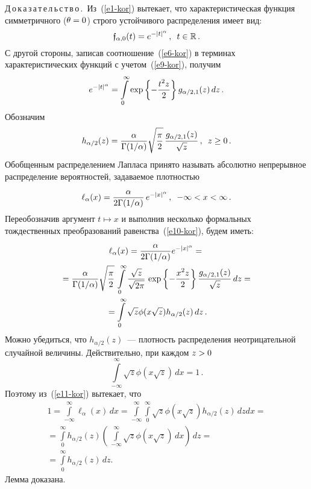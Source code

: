 \begin{multicols}{2}
\noindent
Д\,о\,к\,а\,з\,а\,т\,е\,л\,ь\,с\,т\,в\,о\,.\ Из~(\ref{e1-kor}) вытекает, что характеристическая
функция симметричного ($\theta\hm=0$) строго устойчивого распределения
имеет вид:
\begin{equation}
\mathfrak{f}_{\alpha,0}(t)=e^{-|t|^{\alpha}}\,,\enskip t\in\mathbb{R}\,. \label{e9-kor}
\end{equation}
С другой стороны, записав соотношение~(\ref{e6-kor}) в терминах
характеристических функций с учетом~(\ref{e9-kor}), получим
\begin{equation}
e^{-|t|^{\alpha}}=\int\limits_0^{\infty}\exp\left\{-\displaystyle\frac{\displaystyle t^2z\mathstrut}{\displaystyle 2\mathstrut}\right\}
g_{\alpha/2,1}(z)\,dz\,.\label{e10-kor}
\end{equation}
Обозначим
$$
h_{\alpha/2}(z)=\displaystyle\frac{\displaystyle \alpha\mathstrut}{\displaystyle \Gamma({1}/{\alpha})\mathstrut}\sqrt{\displaystyle\frac{\displaystyle \pi\mathstrut}{\displaystyle 2\mathstrut}}\,
\displaystyle\frac{\displaystyle g_{\alpha/2,1}(z)\mathstrut}{\displaystyle \sqrt{z}\mathstrut}\,,\enskip
z\ge0\,.
$$
Обобщенным распределением Лапласа принято называть абсолютно
непрерывное распределение вероятностей, задаваемое плотностью
$$
\ell_{\alpha}(x)=\displaystyle\frac{\displaystyle \alpha\mathstrut}{\displaystyle 2\Gamma({1}/{\alpha})\mathstrut} \,
e^{-|x|^{\alpha}}\,,\enskip -\infty< x<\infty\,.
$$
Переобозначив аргумент $t\mapsto x$ и выполнив несколько формальных
тождественных преобразований равенства~(\ref{e10-kor}), будем иметь:
\begin{multline}
\ell_{\alpha}(x)=\displaystyle\frac{\displaystyle \alpha\mathstrut}{\displaystyle 2\Gamma({1}/{\alpha})\mathstrut}e^{-|x|^{\alpha}}={}\\
{}=
\displaystyle\frac{\displaystyle \alpha\mathstrut}{\displaystyle \Gamma({1}/{\alpha})\mathstrut}\sqrt{\displaystyle\frac{\displaystyle \pi\mathstrut}{\displaystyle 2\mathstrut}}\,\int\limits_0^{\infty}
\displaystyle\frac{\displaystyle \sqrt{z}\mathstrut}{\displaystyle \sqrt{2\pi}\mathstrut}\,\exp\left\{-\displaystyle\frac{\displaystyle x^2z\mathstrut}{\displaystyle 2\mathstrut}\right\}
\displaystyle\frac{\displaystyle g_{\alpha/2,1}(z)\mathstrut}{\displaystyle \sqrt{z}\mathstrut}\,dz={}\\
{}=
\int\limits_0^{\infty}\sqrt{z}\phi(x\sqrt{z})h_{\alpha/2}(z)\,dz\,.\label{e11-kor}
\end{multline}
Можно убедиться, что $h_{\alpha/2}(z)$~--- плотность распределения
неотрицательной случайной величины. Действительно, при каждом $z\hm>0$
$$
\int\limits_{-\infty}^{\infty}\sqrt{z}\phi(x\sqrt{z})\,dx=1\,.
$$
Поэтому из~(\ref{e11-kor}) вытекает, что
\begin{multline*}
1=\int\limits_{-\infty}^{\infty}\!\ell_{\alpha}(x)\,dx=
\int\limits_{-\infty}^{\infty}\!\int\limits_{0}^{\infty}\!\sqrt{z}\phi(x\sqrt{z})
h_{\alpha/2}(z)\,dz dx={}
\\
{}=\int\limits_{0}^{\infty}\!h_{\alpha/2}(z)\left(\,
\int\limits_{-\infty}^{\infty}\sqrt{z}\phi(x\sqrt{z})\,dx\right)\,dz={}\\
{}=
\int\limits_{0}^{\infty}\!h_{\alpha/2}(z)\,dz.
\end{multline*}
Лемма доказана.


\end{multicols}

